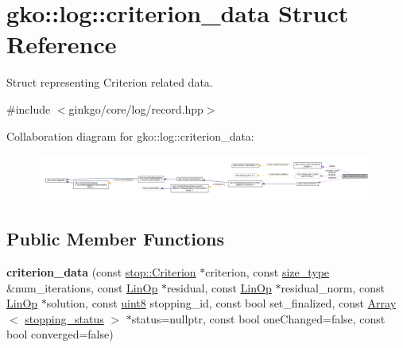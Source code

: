 \hypertarget{structgko_1_1log_1_1criterion__data}{}\section{gko\+:\+:log\+:\+:criterion\+\_\+data Struct Reference}
\label{structgko_1_1log_1_1criterion__data}


Struct representing Criterion related data.  




{\ttfamily \#include $<$ginkgo/core/log/record.\+hpp$>$}



Collaboration diagram for gko\+:\+:log\+:\+:criterion\+\_\+data\+:
\nopagebreak
\begin{figure}[H]
\begin{center}
\leavevmode
\includegraphics[width=350pt]{structgko_1_1log_1_1criterion__data__coll__graph}
\end{center}
\end{figure}
\subsection*{Public Member Functions}
\begin{DoxyCompactItemize}
\item 
\mbox{\label{structgko_1_1log_1_1criterion__data_a8643df5a8f5d0cb01f80823fbdc3f5a0}} 
{\bfseries criterion\+\_\+data} (const \hyperlink{classgko_1_1stop_1_1Criterion}{stop\+::\+Criterion} $\ast$criterion, const \hyperlink{namespacegko_a6e5c95df0ae4e47aab2f604a22d98ee7}{size\+\_\+type} \&num\+\_\+iterations, const \hyperlink{classgko_1_1LinOp}{Lin\+Op} $\ast$residual, const \hyperlink{classgko_1_1LinOp}{Lin\+Op} $\ast$residual\+\_\+norm, const \hyperlink{classgko_1_1LinOp}{Lin\+Op} $\ast$solution, const \hyperlink{namespacegko_a3950fc3732811a8563484e5098c31531}{uint8} stopping\+\_\+id, const bool set\+\_\+finalized, const \hyperlink{classgko_1_1Array}{Array}$<$ \hyperlink{classgko_1_1stopping__status}{stopping\+\_\+status} $>$ $\ast$status=nullptr, const bool one\+Changed=false, const bool converged=false)
\end{DoxyCompactItemize}
